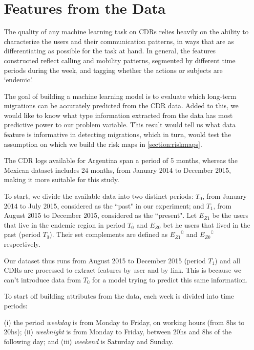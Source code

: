 \newpage


\section{Features from the Data}

The quality of any machine learning task on CDRs relies heavily on the ability to characterize the users and their communication patterns, in ways that are as differentiating as possible for the task at hand.
In general, the features constructed reflect calling and mobility patterns,
segmented by different time periods during the week, and tagging whether the actions or subjects are `endemic'.

The goal of building a machine learning model is to evaluate which long-term migrations can be accurately predicted from the CDR data. Added to this, we would like to know what type information extracted from the data has most predictive power to our problem variable. This result would tell us what data feature is informative in detecting migrations, which in turn, would test the assumption on which we build the risk maps in \cref{section:riskmaps}.

The CDR logs available for Argentina span a period of 5 months,
whereas the Mexican dataset includes 24 months, from January 2014 to December 2015, making it more suitable for this study.

To start, we divide the available data into two distinct periods:
$T_0$, from January 2014 to July 2015, considered as the ``past" in our experiment;
and $T_1$, from August 2015 to December 2015, considered as the ``present". Let $E_{Z1}$ be the users that live in the endemic region in period $T_0$
and  $E_{Z0}$ bet he users that lived in the past (period $T_0$). Their set complements are defined as ${ E_{Z1} }^{\complement}$ and ${ E_{Z0} }^{\complement}$ respectively.

Our dataset thus runs from August 2015 to December 2015 (period $T_1$) and all CDRs are processed to extract features by user and by link. This is because we can't introduce data from $T_0$ for a model trying to predict this same information.

To start off building attributes from the data, each week is divided into time periods:
\begin{definition}\label{def:week-periods}

	(i) the period \textit{weekday} is from Monday to Friday, on working hours (from 8hs to 20hs); (ii) \textit{weeknight} is from Monday to Friday, between 20hs and 8hs of the following day;
	and (iii) \textit{weekend} is Saturday and Sunday.
\end{definition}



